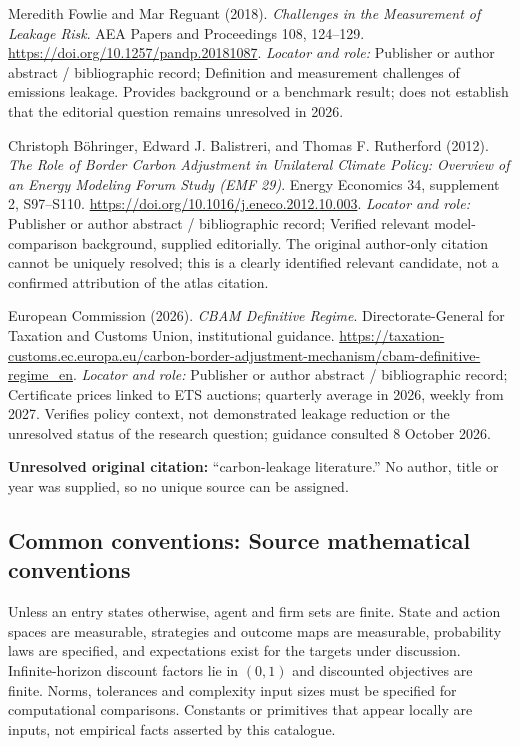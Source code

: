 \documentclass[11pt,a4paper]{article}
\begin{document}
\begin{enumerate}[label={[S\arabic*]},leftmargin=*]

\item Meredith Fowlie and Mar Reguant (2018). \emph{Challenges in the Measurement of Leakage Risk}. AEA Papers and Proceedings 108, 124–129. \url{https://doi.org/10.1257/pandp.20181087}.
\textit{Locator and role:} Publisher or author abstract / bibliographic record; Definition and measurement challenges of emissions leakage. Provides background or a benchmark result; does not establish that the editorial question remains unresolved in 2026.

\item Christoph Böhringer, Edward J. Balistreri, and Thomas F. Rutherford (2012). \emph{The Role of Border Carbon Adjustment in Unilateral Climate Policy: Overview of an Energy Modeling Forum Study (EMF 29)}. Energy Economics 34, supplement 2, S97–S110. \url{https://doi.org/10.1016/j.eneco.2012.10.003}.
\textit{Locator and role:} Publisher or author abstract / bibliographic record; Verified relevant model-comparison background, supplied editorially. The original author-only citation cannot be uniquely resolved; this is a clearly identified relevant candidate, not a confirmed attribution of the atlas citation.

\item European Commission (2026). \emph{CBAM Definitive Regime}. Directorate-General for Taxation and Customs Union, institutional guidance. \url{https://taxation-customs.ec.europa.eu/carbon-border-adjustment-mechanism/cbam-definitive-regime_en}.
\textit{Locator and role:} Publisher or author abstract / bibliographic record; Certificate prices linked to ETS auctions; quarterly average in 2026, weekly from 2027. Verifies policy context, not demonstrated leakage reduction or the unresolved status of the research question; guidance consulted 8 October 2026.

\item \textbf{Unresolved original citation:} ``carbon-leakage literature.'' No author, title or year was supplied, so no unique source can be assigned.

\end{enumerate}

\subsection*{Common conventions: Source mathematical conventions}

Unless an entry states otherwise, agent and firm sets are finite. State and action spaces are measurable, strategies and outcome maps are measurable, probability laws are specified, and expectations exist for the targets under discussion. Infinite-horizon discount factors lie in $(0,1)$ and discounted objectives are finite. Norms, tolerances and complexity input sizes must be specified for computational comparisons. Constants or primitives that appear locally are inputs, not empirical facts asserted by this catalogue.
\end{document}
